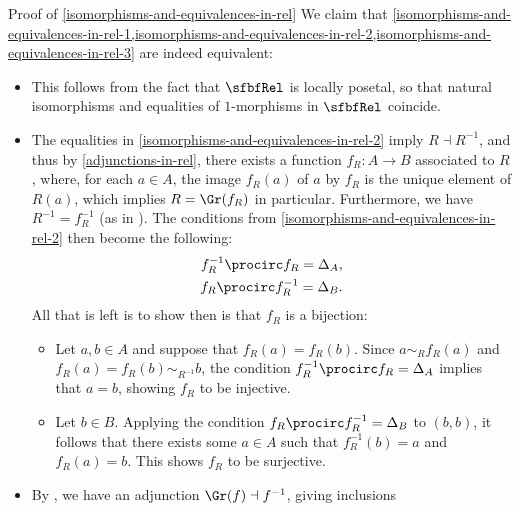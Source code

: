\begin{Proof}{Proof of \cref{isomorphisms-and-equivalences-in-rel}}%
    We claim that \cref{isomorphisms-and-equivalences-in-rel-1,isomorphisms-and-equivalences-in-rel-2,isomorphisms-and-equivalences-in-rel-3} are indeed equivalent:
    \begin{itemize}
        \item{}This follows from the fact that $\sfbfRel$ is locally posetal, so that natural isomorphisms and equalities of $1$-morphisms in $\sfbfRel$ coincide.
        \item{}The equalities in \cref{isomorphisms-and-equivalences-in-rel-2} imply $R\dashv R^{-1}$, and thus by \cref{adjunctions-in-rel}, there exists a function $f_{R}\colon A\to B$ associated to $R$, where, for each $a\in A$, the image $f_{R}(a)$ of $a$ by $f_{R}$ is the unique element of $R(a)$, which implies $R=\Gr(f_{R})$ in particular. Furthermore, we have $R^{-1}=f^{-1}_{R}$ (as in ). The conditions from \cref{isomorphisms-and-equivalences-in-rel-2} then become the following:
            \begin{align*}
                f^{-1}_{R}\procirc f_{R} = \Delta_{A},\\
                f_{R}\procirc f^{-1}_{R} = \Delta_{B}.
            \end{align*}
            All that is left is to show then is that $f_{R}$ is a bijection:
            \begin{itemize}
                \item{}Let $a,b\in A$ and suppose that $f_{R}(a)=f_{R}(b)$. Since $a\sim_{R}f_{R}(a)$ and $f_{R}(a)=f_{R}(b)\sim_{R^{-1}}b$, the condition $f^{-1}_{R}\procirc f_{R}=\Delta_{A}$ implies that $a=b$, showing $f_{R}$ to be injective.
                \item{}Let $b\in B$. Applying the condition $f_{R}\procirc f^{-1}_{R}=\Delta_{B}$ to $(b,b)$, it follows that there exists some $a\in A$ such that $f^{-1}_{R}(b)=a$ and $f_{R}(a)=b$. This shows $f_{R}$ to be surjective.
            \end{itemize}
        \item{}By , we have an adjunction $\Gr(f)\dashv f^{-1}$, giving inclusions

\end{itemize}
\end{Proof}

